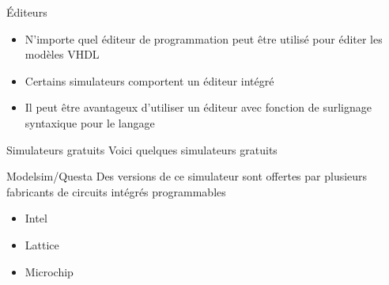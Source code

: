 \documentclass[presentation]{beamer}
\begin{document}
\begin{frame}[label={sec:org2e2cade}]{Éditeurs}
\begin{itemize}
\item N'importe quel éditeur de programmation peut être utilisé pour éditer les modèles VHDL
\item Certains simulateurs comportent un éditeur intégré
\item Il peut être avantageux d'utiliser un éditeur avec fonction de surlignage syntaxique pour le langage
\end{itemize}
\end{frame}

\begin{frame}[label={sec:orgfa1b210}]{Simulateurs gratuits}
Voici quelques simulateurs gratuits 
\end{frame}

\begin{frame}[label={sec:orgaa12312}]{Modelsim/Questa}
Des versions de ce simulateur sont offertes par plusieurs fabricants de circuits intégrés programmables

\begin{itemize}
\item Intel
\item Lattice
\item Microchip
\end{itemize}
\end{frame}
\end{document}
